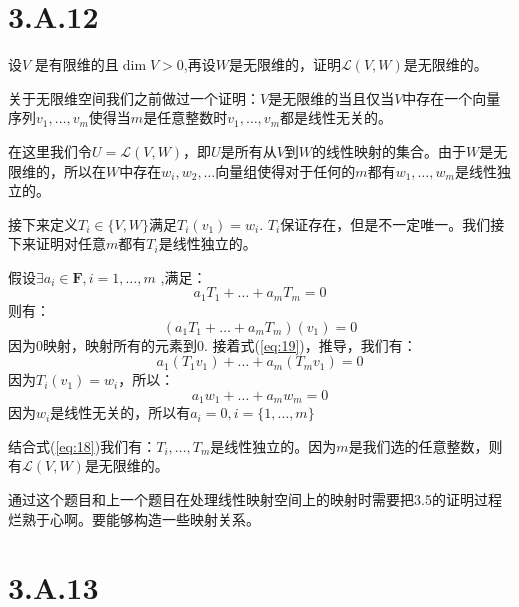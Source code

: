 \documentclass[10pt,a4paper,UTF8]{article}
\begin{document}
\section{3.A.12}
\label{sec:org26708e1}


\begin{problem}
设\(V\) 是有限维的且\(\dim V > 0\),再设\(W\)是无限维的，证明\(\mathcal{L}(V,W)\)是无限维的。
\end{problem}

\begin{answer}
关于无限维空间我们之前做过一个证明：\(V\)是无限维的当且仅当\(V\)中存在一个向量序列\(v_{1},\ldots ,v_{m}\)使得当\(m\)是任意整数时\(v_{1},\ldots ,v_{m}\)都是线性无关的。

在这里我们令\(U= \mathcal{L}(V,W)\)，即\(U\)是所有从\(V\)到\(W\)的线性映射的集合。由于\(W\)是无限维的，所以在\(W\)中存在\(w_{i},w_{2},\ldots\)向量组使得对于任何的\(m\)都有\(w_{1},\ldots ,w_{m}\)是线性独立的。

接下来定义\(T_{i}\in \{V,W\}\)满足\(T_{i}(v_{1}) = w_{i}\). \(T_{i}\)保证存在，但是不一定唯一。我们接下来证明对任意\(m\)都有\(T_{i}\)是线性独立的。

假设\(\exists a_{i}\in \mathbf{F},i=1,\ldots ,m\) ,满足：
\begin{equation}
\label{eq:18}
a_{1}T_{1} + \ldots + a_{m}T_{m} = 0
\end{equation}
则有：
\begin{equation}
\label{eq:19}
(a_{1}T_{1} + \ldots + a_{m}T_{m})(v_{1}) = 0
\end{equation}
因为\(0\)映射，映射所有的元素到\(0\). 接着式(\ref{eq:19})，推导，我们有：
\begin{equation}
\label{eq:20}
a_{1}(T_{1}v_{1}) + \ldots + a_{m}(T_{m}v_{1}) = 0
\end{equation}
因为\(T_{i}(v_{1}) = w_{i}\)，所以：
\begin{equation}
\label{eq:21}
a_{1}w_{1} + \ldots + a_{m}w_{m}= 0
\end{equation}
因为\(w_{i}\)是线性无关的，所以有\(a_{i}=0,i=\{1,\ldots ,m\}\)

结合式(\ref{eq:18})我们有：\(T_{i},\ldots ,T_{m}\)是线性独立的。因为\(m\)是我们选的任意整数，则有\(\mathcal{L}(V,W)\)是无限维的。

通过这个题目和上一个题目在处理线性映射空间上的映射时需要把3.5的证明过程烂熟于心啊。要能够构造一些映射关系。
\end{answer}

\section{3.A.13}
\label{sec:org6352880}
\end{document}
